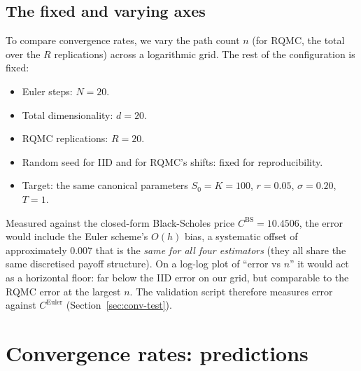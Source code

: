 \documentclass[11pt,a4paper]{article}
\theoremstyle{plain}
\theoremstyle{definition}
\theoremstyle{remark}
\begin{document}
\subsection{The fixed and varying axes}

To compare convergence rates, we vary the path count $n$ (for RQMC,
the total over the $R$ replications) across a logarithmic grid. The
rest of the configuration
is fixed:
\begin{itemize}
\item Euler steps: $N = 20$.
\item Total dimensionality: $d = 20$.
\item RQMC replications: $R = 20$.
\item Random seed for IID and for RQMC's shifts: fixed for
reproducibility.
\item Target: the same canonical parameters $S_0 = K = 100$, $r =
0.05$, $\sigma = 0.20$, $T = 1$.
\end{itemize}
Measured against the closed-form Black-Scholes price
$C^{\mathrm{BS}} = 10.4506$, the error would include the Euler
scheme's $O(h)$ bias, a systematic offset of approximately $0.007$
that is the \emph{same for all four estimators} (they all share the
same discretised payoff structure). On a log-log plot of ``error vs
$n$'' it would act as a horizontal floor: far below the IID error
on our grid, but comparable to the RQMC error at the largest $n$.
The validation script therefore measures error against
$C^{\mathrm{Euler}}$ (Section~\ref{sec:conv-test}).

\section{Convergence rates: predictions}
\label{sec:rates}
\end{document}
